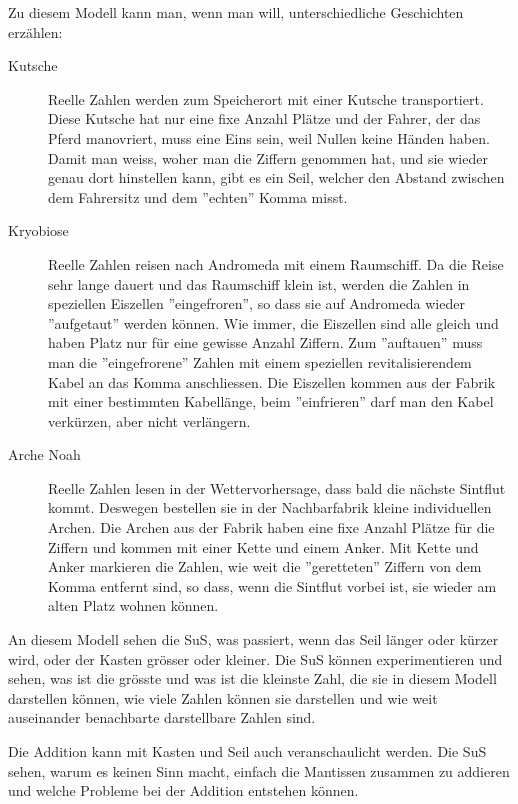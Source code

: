 \documentclass{article}
\begin{document}
Zu diesem Modell kann man, wenn man will, unterschiedliche Geschichten erzählen:
\begin{description}
\item[Kutsche] Reelle Zahlen werden zum Speicherort mit einer Kutsche transportiert. Diese Kutsche hat nur eine fixe Anzahl Plätze und der Fahrer, der das Pferd manovriert, muss eine Eins sein, weil Nullen keine Händen haben. Damit man weiss, woher man die Ziffern genommen hat, und sie wieder genau dort hinstellen kann, gibt es ein Seil, welcher den Abstand zwischen dem Fahrersitz und dem ''echten'' Komma misst.
\item[Kryobiose] Reelle Zahlen reisen nach Andromeda mit einem Raumschiff. Da die Reise sehr lange dauert und das Raumschiff klein ist, werden die Zahlen in speziellen Eiszellen ''eingefroren'', so dass sie auf Andromeda wieder ''aufgetaut'' werden können. Wie immer, die Eiszellen sind alle gleich und haben Platz nur für eine gewisse Anzahl Ziffern. Zum ''auftauen'' muss man die ''eingefrorene'' Zahlen mit einem speziellen revitalisierendem Kabel an das Komma anschliessen. Die Eiszellen kommen aus der Fabrik mit einer bestimmten Kabellänge, beim ''einfrieren'' darf man den Kabel verkürzen, aber nicht verlängern.
\item[Arche Noah] Reelle Zahlen lesen in der Wettervorhersage, dass bald die nächste Sintflut kommt. Deswegen bestellen sie in der Nachbarfabrik kleine individuellen Archen. Die Archen aus der Fabrik haben eine fixe Anzahl Plätze für die Ziffern und kommen mit einer Kette und einem Anker. Mit Kette und Anker markieren die Zahlen, wie weit die ''geretteten'' Ziffern von dem Komma entfernt sind, so dass, wenn die Sintflut vorbei ist, sie wieder am alten Platz wohnen können.
\end{description}

An diesem Modell sehen die SuS, was passiert, wenn das Seil länger oder kürzer wird, oder der Kasten grösser oder kleiner. Die SuS können experimentieren und sehen, was ist die grösste und was ist die kleinste Zahl, die sie in diesem Modell darstellen können, wie viele Zahlen können sie darstellen und wie weit auseinander benachbarte darstellbare Zahlen sind.

Die Addition kann mit Kasten und Seil auch veranschaulicht werden. Die SuS sehen, warum es keinen Sinn macht, einfach die Mantissen zusammen zu addieren und welche Probleme bei der Addition entstehen können.
\end{document}
